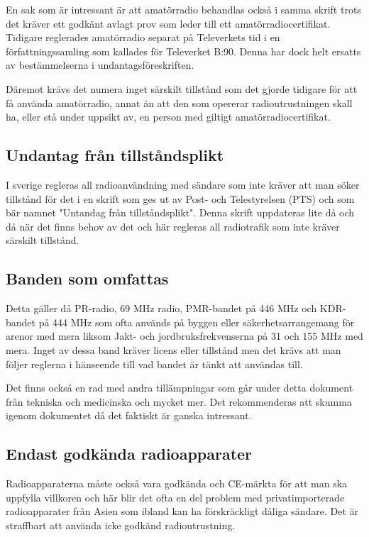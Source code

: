 En sak som är intressant är att amatörradio behandlas också i samma skrift
trots det kräver ett godkänt avlagt prov som leder till ett
amatörradiocertifikat. Tidigare reglerades amatörradio separat på Televerkets
tid i en författningssamling som kallades för Televerket B:90. Denna har dock
helt ersatts av bestämmelserna i undantagsföreskriften.

Däremot krävs det numera inget särskilt tillstånd som det gjorde tidigare för
att få använda amatörradio, annat än att den som opererar radioutrustningen
skall ha, eller stå under uppsikt av, en person med giltigt
amatörradiocertifikat.

\subsection{Undantag från tillståndsplikt}

I sverige regleras all radioanvändning med sändare som inte kräver att man
söker tillstånd för det i en skrift som ges ut av Post- och Telestyrelsen
(PTS) och som bär namnet "Untandag från tillståndsplikt". Denna skrift
uppdateras lite då och då när det finns behov av det och här regleras all
radiotrafik som inte kräver särskilt tillstånd.

\subsection{Banden som omfattas}

Detta gäller då PR-radio, 69 MHz radio, PMR-bandet på 446 MHz och KDR-bandet
på 444 MHz som ofta används på byggen eller säkerhetsarrangemang för arenor
med mera liksom Jakt- och jordbruksfrekvenserna på 31 och 155 MHz med mera.
Inget av dessa band kräver licens eller tillstånd men det krävs att man följer
reglerna i hänseende till vad bandet är tänkt att användas till.

Det finns också en rad med andra tillämpningar som går under detta dokument från
tekniska och medicinska och mycket mer. Det rekommenderas att skumma igenom
dokumentet då det faktiskt är ganska intressant.

\subsection{Endast godkända radioapparater}

Radioapparaterna måste också vara godkända och CE-märkta för att man ska
uppfylla villkoren och här blir det ofta en del problem med privatimporterade
radioapparater från Asien som ibland kan ha förskräckligt dåliga sändare. Det
är straffbart att använda icke godkänd radioutrustning.

